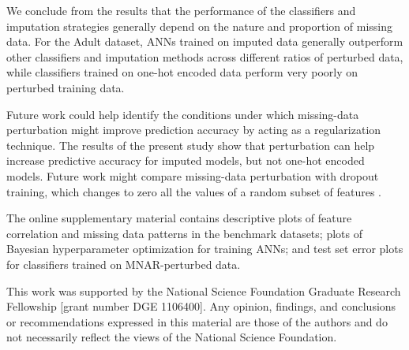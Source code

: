\documentclass[10pt]{book}
\theoremstyle{definition}
\begin{document}
We conclude from the results that the performance of the classifiers and imputation strategies generally depend on the nature and proportion of missing data. For the Adult dataset, ANNs trained on imputed data generally outperform other classifiers and imputation methods across different ratios of perturbed data, while classifiers trained on one-hot encoded data perform very poorly on perturbed training data. 

Future work could help identify the conditions under which missing-data perturbation might improve prediction accuracy by acting as a regularization technique. The results of the present study show that perturbation can help increase predictive accuracy for imputed models, but not one-hot encoded models. Future work might compare missing-data perturbation with dropout training, which changes to zero all the values of a random subset of features \citep{hinton2012, maaten2013, wang2013}. 

\par
\vskip 14pt

The online supplementary material contains descriptive plots of feature correlation and missing data patterns in the benchmark datasets; plots of Bayesian hyperparameter optimization for training ANNs; and test set error plots for classifiers trained on MNAR-perturbed data. %

\par
\vskip 14pt

This work was supported by the National Science Foundation Graduate Research Fellowship [grant number DGE 1106400]. Any opinion, findings, and conclusions or recommendations expressed in this material are those of the authors and do not necessarily reflect the views of the National Science Foundation.
\par
%
\end{document}
